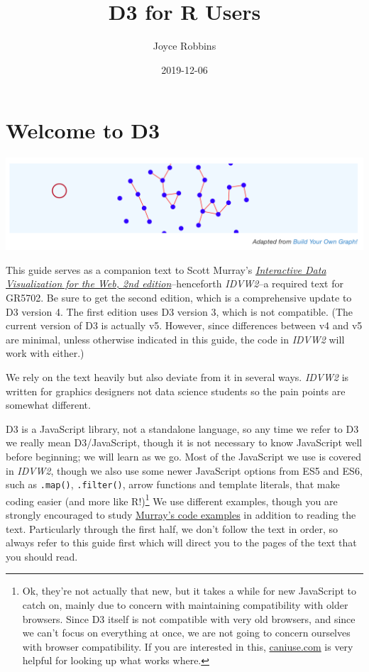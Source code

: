 \documentclass[openany]{book}
\title{D3 for R Users}
\author{Joyce Robbins}
\date{2019-12-06}
\let\rmarkdownfootnote\footnote%
\def\footnote{\protect\rmarkdownfootnote}
\begin{document}
\maketitle

{
\setcounter{tocdepth}{1}
\tableofcontents
}
\hypertarget{welcome-to-d3}{%
\chapter*{Welcome to D3}\label{welcome-to-d3}}

\hypertarget{container}{}

\includegraphics[width=1\linewidth]{images/pdfbook/buildyourowngraph}

This guide serves as a companion text to Scott Murray's \href{https://www.amazon.com/Interactive-Data-Visualization-Web-Introduction/dp/1491921285/}{\emph{Interactive Data Visualization for the Web, 2nd edition}}--henceforth \emph{IDVW2}--a required text for GR5702. Be sure to get the second edition, which is a comprehensive update to D3 version 4. The first edition uses D3 version 3, which is not compatible. (The current version of D3 is actually v5. However, since differences between v4 and v5 are minimal, unless otherwise indicated in this guide, the code in \emph{IDVW2} will work with either.)

We rely on the text heavily but also deviate from it in several ways. \emph{IDVW2} is written for graphics designers not data science students so the pain points are somewhat different.

D3 is a JavaScript library, not a standalone language, so any time we refer to D3 we really mean D3/JavaScript, though it is not necessary to know JavaScript well before beginning; we will learn as we go. Most of the JavaScript we use is covered in \emph{IDVW2}, though we also use some newer JavaScript options from ES5 and ES6, such as \texttt{.map()}, \texttt{.filter()}, arrow functions and template literals, that make coding easier (and more like R!)\footnote{Ok, they're not actually that new, but it takes a while for new JavaScript to catch on, mainly due to concern with maintaining compatibility with older browsers. Since D3 itself is not compatible with very old browsers, and since we can't focus on everything at once, we are not going to concern ourselves with browser compatibility. If you are interested in this, \href{https://caniuse.com}{caniuse.com} is very helpful for looking up what works where.} We use different examples, though you are strongly encouraged to study \href{https://github.com/alignedleft/d3-book/releases}{Murray's code examples} in addition to reading the text. Particularly through the first half, we don't follow the text in order, so always refer to this guide first which will direct you to the pages of the text that you should read.
\end{document}
